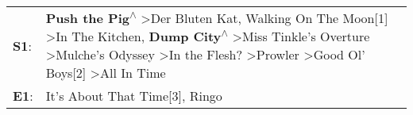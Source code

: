 \begin{supertabular}{p{0.03\textwidth}p{0.92\textwidth}}
 \textbf{S1}:  &  \textbf{Push the Pig\textsuperscript{$\wedge$}} \textgreater \enspace Der Bluten Kat\textsuperscript{}, \enspace Walking On The Moon[1]\textsuperscript{} \textgreater \enspace In The Kitchen\textsuperscript{}, \enspace \textbf{Dump City\textsuperscript{$\wedge$}} \textgreater \enspace Miss Tinkle's Overture\textsuperscript{} \textgreater \enspace Mulche's Odyssey\textsuperscript{} \textgreater \enspace In the Flesh?\textsuperscript{} \textgreater \enspace Prowler\textsuperscript{} \textgreater \enspace Good Ol' Boys[2]\textsuperscript{} \textgreater \enspace All In Time\textsuperscript{}  \enspace  \\
 \textbf{E1}:  &                                                                                                                                                                                                                                                                                                                                                                                                                                                                                                                                         It's About That Time[3]\textsuperscript{}, \enspace Ringo\textsuperscript{}  \enspace  \\
\end{supertabular}
